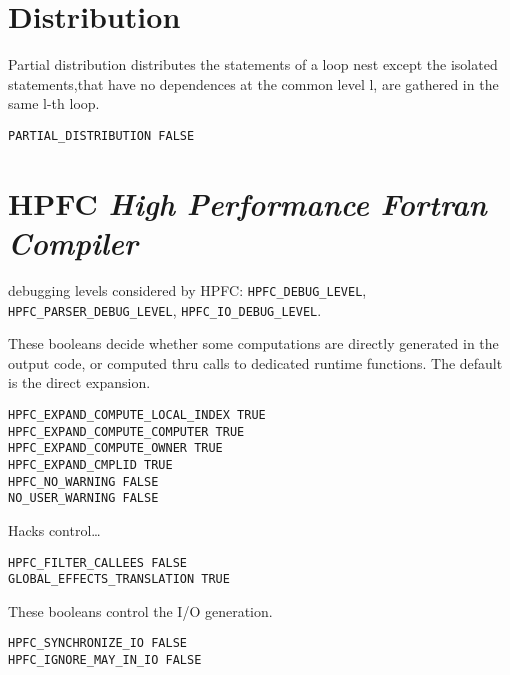 \section{Distribution}

Partial distribution distributes the statements of a loop nest except
 the isolated statements,that have no dependences at the common level l,
 are gathered in the same l-th loop.

\begin{verbatim}
PARTIAL_DISTRIBUTION FALSE
\end{verbatim}

\section{HPFC {\em High Performance Fortran Compiler}}

debugging levels considered by HPFC: {\tt HPFC\_DEBUG\_LEVEL}, 
{\tt HPFC\_PARSER\_DEBUG\_LEVEL}, {\tt HPFC\_IO\_DEBUG\_LEVEL}.

  These booleans decide whether some computations are directly
generated in the output code, or computed thru calls to dedicated
runtime functions. The default is the direct expansion.

\begin{verbatim}
HPFC_EXPAND_COMPUTE_LOCAL_INDEX TRUE
HPFC_EXPAND_COMPUTE_COMPUTER TRUE
HPFC_EXPAND_COMPUTE_OWNER TRUE
HPFC_EXPAND_CMPLID TRUE
HPFC_NO_WARNING FALSE
NO_USER_WARNING FALSE
\end{verbatim}

   Hacks control\ldots

\begin{verbatim}
HPFC_FILTER_CALLEES FALSE
GLOBAL_EFFECTS_TRANSLATION TRUE
\end{verbatim}

  These booleans control the I/O generation.

\begin{verbatim}
HPFC_SYNCHRONIZE_IO FALSE
HPFC_IGNORE_MAY_IN_IO FALSE
\end{verbatim}





